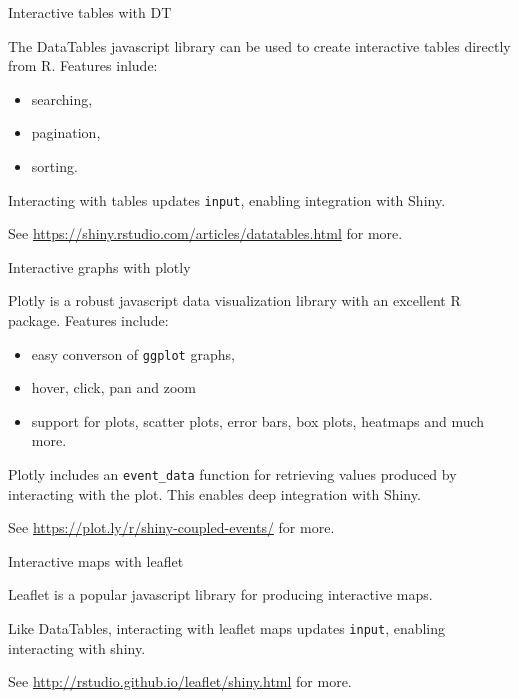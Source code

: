 \documentclass[
  12pt,
  ignorenonframetext,
]{beamer}
\providecommand{\tightlist}{%
  \setlength{\itemsep}{0pt}\setlength{\parskip}{0pt}}
\begin{document}
\begin{frame}[fragile]{Interactive tables with DT}
\protect\hypertarget{interactive-tables-with-dt}{}

The DataTables javascript library can be used to create interactive
tables directly from R. Features inlude:

\begin{itemize}
\tightlist
\item
  searching,
\item
  pagination,
\item
  sorting.
\end{itemize}

Interacting with tables updates \texttt{input}, enabling integration
with Shiny.

See \url{https://shiny.rstudio.com/articles/datatables.html} for more.

\end{frame}

\begin{frame}[fragile]{Interactive graphs with plotly}
\protect\hypertarget{interactive-graphs-with-plotly}{}

Plotly is a robust javascript data visualization library with an
excellent R package. Features include:

\begin{itemize}
\tightlist
\item
  easy converson of \texttt{ggplot} graphs,
\item
  hover, click, pan and zoom
\item
  support for plots, scatter plots, error bars, box plots, heatmaps and
  much more.
\end{itemize}

Plotly includes an \texttt{event\_data} function for retrieving values
produced by interacting with the plot. This enables deep integration
with Shiny.

See \url{https://plot.ly/r/shiny-coupled-events/} for more.

\end{frame}

\begin{frame}[fragile]{Interactive maps with leaflet}
\protect\hypertarget{interactive-maps-with-leaflet}{}

Leaflet is a popular javascript library for producing interactive maps.

Like DataTables, interacting with leaflet maps updates \texttt{input},
enabling interacting with shiny.

See \url{http://rstudio.github.io/leaflet/shiny.html} for more.

\end{frame}
\end{document}
